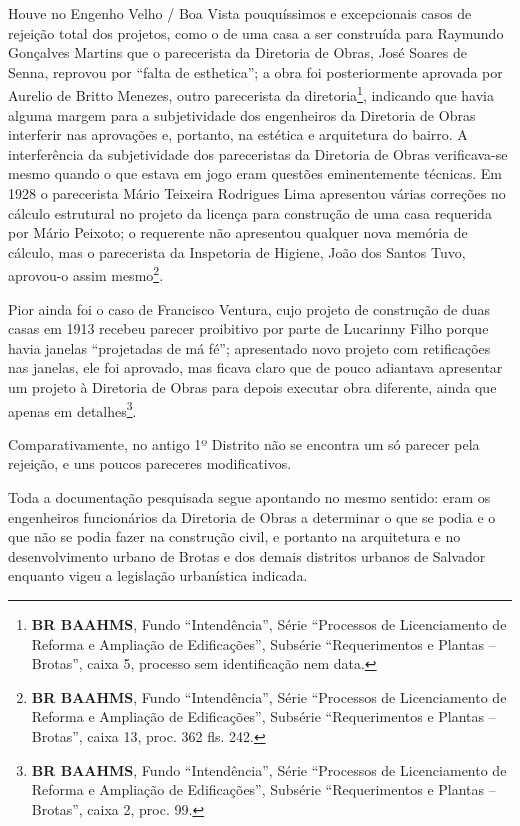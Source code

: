 Houve no Engenho Velho / Boa Vista pouquíssimos e excepcionais casos de rejeição total dos projetos, como o de uma casa a ser construída para Raymundo Gonçalves Martins que o parecerista da Diretoria de Obras, José Soares de Senna, reprovou por ``falta de esthetica''; a obra foi posteriormente aprovada por Aurelio de Britto Menezes, outro parecerista da diretoria\footnote{\textbf{BR BAAHMS}, Fundo ``Intendência'', Série ``Processos de Licenciamento de Reforma e Ampliação de Edificações'', Subsérie ``Requerimentos e Plantas – Brotas'', caixa 5, processo sem identificação nem data.}, indicando que havia alguma margem para a subjetividade dos engenheiros da Diretoria de Obras interferir nas aprovações e, portanto, na estética e arquitetura do bairro. A interferência da subjetividade dos pareceristas da Diretoria de Obras verificava-se mesmo quando o que estava em jogo eram questões eminentemente técnicas. Em 1928 o parecerista Mário Teixeira Rodrigues Lima apresentou várias correções no cálculo estrutural no projeto da licença para construção de uma casa requerida por Mário Peixoto; o requerente não apresentou qualquer nova memória de cálculo, mas o parecerista da Inspetoria de Higiene, João dos Santos Tuvo, aprovou-o assim mesmo\footnote{\textbf{BR BAAHMS}, Fundo ``Intendência'', Série ``Processos de Licenciamento de Reforma e Ampliação de Edificações'', Subsérie ``Requerimentos e Plantas – Brotas'', caixa 13, proc. 362 fls. 242.}. 

Pior ainda foi o caso de Francisco Ventura, cujo projeto de construção de duas casas em 1913 recebeu parecer proibitivo por parte de Lucarinny Filho porque havia janelas ``projetadas de má fé''; apresentado novo projeto com retificações nas janelas, ele foi aprovado, mas ficava claro que de pouco adiantava apresentar um projeto à Diretoria de Obras para depois executar obra diferente, ainda que apenas em detalhes\footnote{\textbf{BR BAAHMS}, Fundo ``Intendência'', Série ``Processos de Licenciamento de Reforma e Ampliação de Edificações'', Subsérie ``Requerimentos e Plantas – Brotas'', caixa 2, proc. 99.}.

Comparativamente, no antigo 1º Distrito não se encontra um só parecer pela rejeição, e uns poucos pareceres modificativos.  

Toda a documentação pesquisada segue apontando no mesmo sentido: eram os engenheiros funcionários da Diretoria de Obras a determinar o que se podia e o que não se podia fazer na construção civil, e portanto na arquitetura e no desenvolvimento urbano de Brotas e dos demais distritos urbanos de Salvador enquanto vigeu a legislação urbanística indicada.

